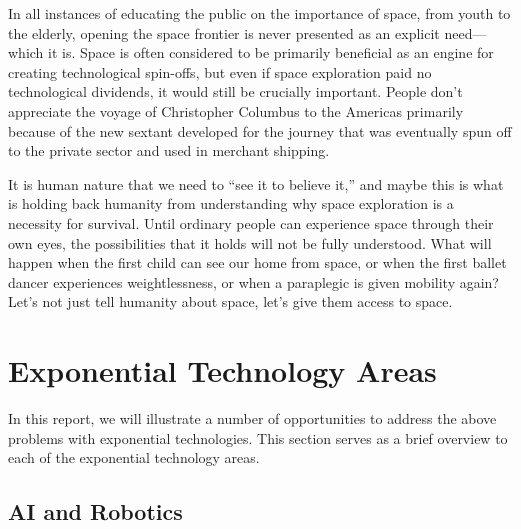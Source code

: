 \documentclass[letter,11pt]{article}
\begin{document}
In  all instances of educating the public on the importance of space, from  youth to the elderly, opening the space frontier is never presented as  an explicit need---which it is. Space is often considered to be  primarily beneficial as an engine for creating technological spin-offs,  but even if space exploration paid no technological dividends, it would  still be crucially important. People don't appreciate the voyage of  Christopher Columbus to the Americas primarily because of the new  sextant developed for the journey that was eventually spun off to the  private sector and used in merchant shipping.

It is human nature that we need to ``see it to believe it,'' and maybe this is what is holding back humanity  from understanding why space exploration is a necessity for survival.  Until ordinary people can experience space through their own eyes, the  possibilities that it holds will not be fully understood. What will  happen when the first child can see our home from space, or when the  first ballet dancer experiences weightlessness, or when a paraplegic is  given mobility again? Let's not just tell humanity about space, let's  give them access to space.



\section{Exponential Technology Areas}
\label{et-overview}

In this report, we will illustrate a number of opportunities to address the
above problems with exponential technologies. This section serves as a brief
overview to each of the exponential technology areas.

\subsection{AI and Robotics}
\label{et-ai}

\end{document}
